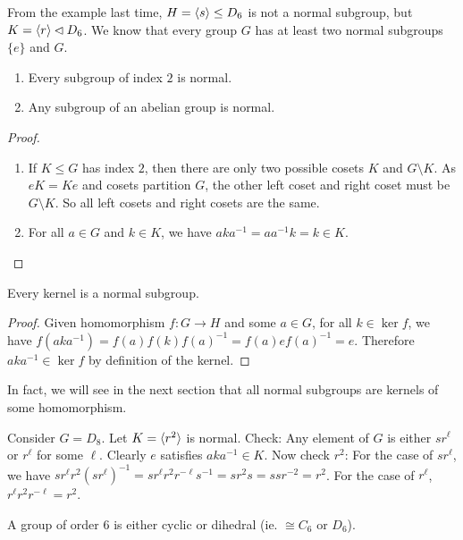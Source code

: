 \documentclass[a4paper]{article}
\begin{document}
  From the example last time, $H=\langle s\rangle\leq D_6$ is not a normal subgroup, but $K=\langle r\rangle \lhd D_6$. We know that every group $G$ has at least two normal subgroups $\{e\}$ and $G$.

  \begin{lemma}\leavevmode
    \begin{enumerate}
      \item Every subgroup of index $2$ is normal.
      \item Any subgroup of an abelian group is normal.
    \end{enumerate}
  \end{lemma}

  \begin{proof}\leavevmode
    \begin{enumerate}
      \item If $K\leq G$ has index $2$, then there are only two possible cosets $K$ and $G\setminus K$. As $eK = Ke$ and cosets partition $G$, the other left coset and right coset must be $G\setminus K$. So all left cosets and right cosets are the same.
      \item For all $a\in G$ and $k\in K$, we have $aka^{-1} = aa^{-1}k = k\in K$.
    \end{enumerate}
  \end{proof}
  \begin{prop}
    Every kernel is a normal subgroup. 
  \end{prop}

  \begin{proof}
    Given homomorphism $f:G\rightarrow H$ and some $a\in G$, for all $k\in \ker f$, we have $f(aka^{-1}) = f(a)f(k)f(a)^{-1} = f(a)ef(a)^{-1} = e$. Therefore $aka^{-1}\in\ker f$ by definition of the kernel.
  \end{proof}

  In fact, we will see in the next section that all normal subgroups are kernels of some homomorphism.

  \begin{eg}
    Consider $G = D_8$. Let $K = \langle r^2\rangle$ is normal. Check: Any element of $G$ is either $sr^\ell$ or $r^\ell$ for some $\ell$. Clearly $e$ satisfies $aka^{-1}\in K$. Now check $r^2$: For the case of $sr^\ell$, we have $sr^\ell r^2(sr^\ell)^{-1} = sr^\ell r^2 r^{-\ell}s^{-1} = sr^2 s = ssr^{-2} = r^2$. For the case of $r^\ell$, $r^\ell r^2r^{-\ell} = r^2$.
  \end{eg}

  \begin{prop}
    A group of order $6$ is either cyclic or dihedral (ie. $\cong C_6$ or $D_6$).
  \end{prop}
\end{document}
